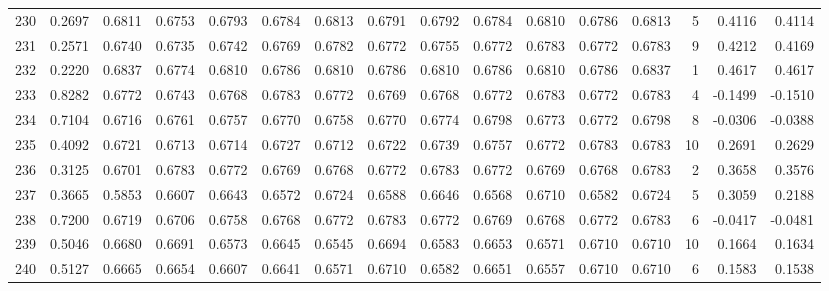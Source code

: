 \begin{tabular}{lrrrrrrrrrrrrrrr}
230 &      0.2697 &  0.6811 &  0.6753 &  0.6793 &  0.6784 &  0.6813 &  0.6791 &  0.6792 &  0.6784 &  0.6810 &   0.6786 &     0.6813 &      5 &                    0.4116 &                     0.4114 \\
231 &      0.2571 &  0.6740 &  0.6735 &  0.6742 &  0.6769 &  0.6782 &  0.6772 &  0.6755 &  0.6772 &  0.6783 &   0.6772 &     0.6783 &      9 &                    0.4212 &                     0.4169 \\
232 &      0.2220 &  0.6837 &  0.6774 &  0.6810 &  0.6786 &  0.6810 &  0.6786 &  0.6810 &  0.6786 &  0.6810 &   0.6786 &     0.6837 &      1 &                    0.4617 &                     0.4617 \\
233 &      0.8282 &  0.6772 &  0.6743 &  0.6768 &  0.6783 &  0.6772 &  0.6769 &  0.6768 &  0.6772 &  0.6783 &   0.6772 &     0.6783 &      4 &                   -0.1499 &                    -0.1510 \\
234 &      0.7104 &  0.6716 &  0.6761 &  0.6757 &  0.6770 &  0.6758 &  0.6770 &  0.6774 &  0.6798 &  0.6773 &   0.6772 &     0.6798 &      8 &                   -0.0306 &                    -0.0388 \\
235 &      0.4092 &  0.6721 &  0.6713 &  0.6714 &  0.6727 &  0.6712 &  0.6722 &  0.6739 &  0.6757 &  0.6772 &   0.6783 &     0.6783 &     10 &                    0.2691 &                     0.2629 \\
236 &      0.3125 &  0.6701 &  0.6783 &  0.6772 &  0.6769 &  0.6768 &  0.6772 &  0.6783 &  0.6772 &  0.6769 &   0.6768 &     0.6783 &      2 &                    0.3658 &                     0.3576 \\
237 &      0.3665 &  0.5853 &  0.6607 &  0.6643 &  0.6572 &  0.6724 &  0.6588 &  0.6646 &  0.6568 &  0.6710 &   0.6582 &     0.6724 &      5 &                    0.3059 &                     0.2188 \\
238 &      0.7200 &  0.6719 &  0.6706 &  0.6758 &  0.6768 &  0.6772 &  0.6783 &  0.6772 &  0.6769 &  0.6768 &   0.6772 &     0.6783 &      6 &                   -0.0417 &                    -0.0481 \\
239 &      0.5046 &  0.6680 &  0.6691 &  0.6573 &  0.6645 &  0.6545 &  0.6694 &  0.6583 &  0.6653 &  0.6571 &   0.6710 &     0.6710 &     10 &                    0.1664 &                     0.1634 \\
240 &      0.5127 &  0.6665 &  0.6654 &  0.6607 &  0.6641 &  0.6571 &  0.6710 &  0.6582 &  0.6651 &  0.6557 &   0.6710 &     0.6710 &      6 &                    0.1583 &                     0.1538 \\

\end{tabular}
